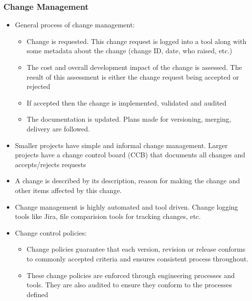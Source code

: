 \documentclass{article}
\begin{document}
\subsubsection{Change Management}
\begin{itemize}
    \item General process of change management:
    \begin{itemize}
        \item Change is requested. This change request is logged into a tool along with some metadata about the change (change ID, date, who raised, etc.)
        
        \item The cost and overall development impact of the change is assessed. The result of this assessment is either the change request being accepted or rejected
        
        \item If accepted then the change is implemented, validated and audited
        
        \item The documentation is updated. Plans made for versioning, merging, delivery are followed.
    \end{itemize}
    
    \item Smaller projects have simple and informal change management. Larger projects have a change control board (CCB) that documents all changes and accepts/rejects requests
    
    \item A change is described by its description, reason for making the change and other items affected by this change. 
    
    \item Change management is highly automated and tool driven. Change logging tools like Jira, file comparision tools for tracking changes, etc. 
    
    \item Change control policies: 
    \begin{itemize}
    
        \item Change policies guarantee that each version, revision or release conforms to commonly accepted criteria and ensures consistent process throughout.

        \item These change policies are enforced through engineering processes and tools. They are also audited to ensure they conform to the processes defined
    \end{itemize}
\end{itemize}
\end{document}
